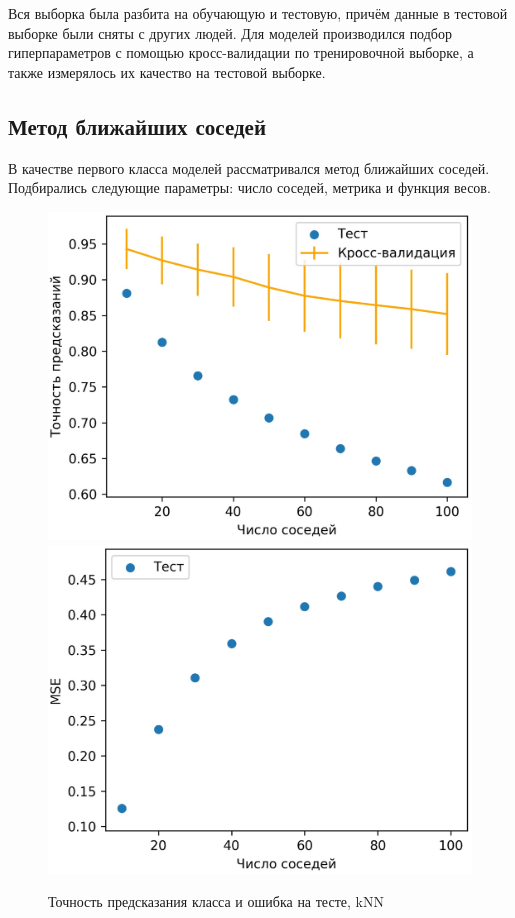 \documentclass[12pt,twoside]{article}
\begin{document}
Вся выборка была разбита на обучающую и тестовую, причём данные в тестовой выборке были сняты с других людей.
Для моделей производился подбор гиперпараметров с помощью кросс-валидации по тренировочной выборке, а также измерялось их качество на тестовой выборке.

\subsection{Метод ближайших соседей}
В качестве первого класса моделей рассматривался метод ближайших соседей. Подбирались следующие параметры: число соседей, метрика и функция весов.

\begin{figure}[H]
    \includegraphics[scale=0.15]{charts/knn.eps}
    \includegraphics[scale=0.15]{charts/knn_mse.eps}
    \centering
    \caption{Точность предсказания класса и ошибка на тесте, kNN}
\end{figure}
\end{document}
